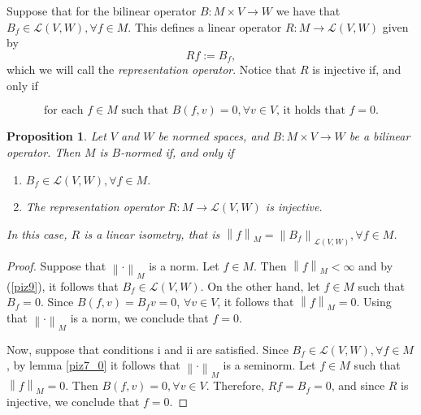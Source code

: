 \documentclass[14pt, a4paper]{article}  %
\providecommand{\pare}[1]{\left( #1\right) }
\providecommand{\norm}[1]{\left\lVert#1\right\rVert}
\newcommand{\tien}{\rightarrow}
\newtheorem{proposition}{Proposition}[section]
\begin{document}
 Suppose that for the bilinear operator $B:M\times V\tien W$ we have that  $B_{f}\in \mathcal{L}\pare{V,W},  \forall f\in M.$ This defines a linear operator $R:M\tien \mathcal{L}\pare{V,W}$ given by \begin{equation}
Rf:=B_{f},
\end{equation} which we will call the \emph{representation operator}. Notice that  $R$ is injective if, and only if

 

\begin{equation} 
	\text{for each $f\in M$ such that $B\pare{f,v}=0,\forall v\in V$, it holds that $f=0$.}  
	\tag{Property I}\label{lola76_0}
\end{equation}

 






 














\begin{proposition}\label{piz4_2}
	Let $V$ and $W$ be normed spaces, and $B:M\times V \tien W$ be a bilinear operator. Then  $M$ is  $B$-normed if, and only if
	\begin{enumerate}
		\item[i.] $B_{f}\in \mathcal{L}\pare{V,W},  \forall f\in M.$
		\item[ii.] The representation operator $R:M\tien \mathcal{L}\pare{V,W}$ is injective. 
	\end{enumerate}   In this case,   $R$ is a linear isometry, that is  $\norm{f}_{M}=\norm{B_{f}}_{\mathcal{L}\pare{V,W}},\forall f\in M$.
\end{proposition}
\begin{proof}
	Suppose that $\norm{\cdot}_{M}$ is a norm. Let $f\in M$. Then $\norm{f}_{M}<\infty$ and by   (\ref{piz9}), it follows that $B_{f}\in \mathcal{L}\pare{V,W}$.  On the other hand, let  $f\in M$ such that $B_{f}=0$. Since $B\pare{f,v}=B_{f}v=0$, $\forall v\in V$, it follows that $\norm{f}_{M}=0$. Using that   $\norm{\cdot}_{M}$ is a norm, we conclude that  $f=0$.  
	
	Now, suppose that conditions i and ii are satisfied. Since $B_{f}\in \mathcal{L}\pare{V,W},  \forall f\in M$, by lemma \ref{piz7_0} it follows that $\norm{\cdot}_{M}$ is a seminorm. Let $f\in M$ such that $\norm{f}_{M}=0$. Then $B\pare{f,v}=0,\forall v\in V$. Therefore, $Rf=B_{f}=0$, and since $R$ is injective, we conclude that  $f=0$.  
\end{proof}
\end{document}

